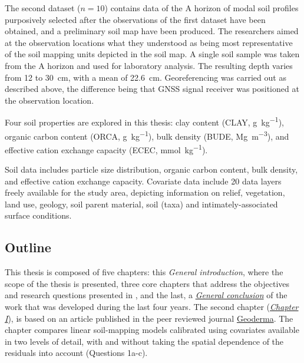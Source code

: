 The second dataset ($n = 10$) contains data of the A horizon of modal soil profiles purposively 
selected after the observations of the first dataset have been obtained, and a preliminary soil map 
have been produced. The researchers aimed at the observation locations what they understood as
being most representative of the soil mapping units depicted in the soil map. A single soil sample
was taken from the A horizon and used for laboratory analysis. The resulting depth varies from 
\num{12} to \SI{30}{\centi\metre}, with a mean of \SI{22.6}{\centi\metre}. Georeferencing was 
carried out as described above, the difference being that GNSS signal receiver was positioned at the
observation location.

Four soil properties are explored in this thesis: clay content (CLAY, \si{\gram\per\kilo\gram}), 
organic carbon content (ORCA, \si{\gram\per\kilo\gram}), bulk density (BUDE, 
\si{\mega\gram\per\cubic\metre}), and effective cation exchange capacity (ECEC, 
\si{\milli\mole\per\kilo\gram}).

Soil data includes particle size distribution, organic carbon content, bulk density, and effective 
cation exchange capacity. Covariate data include 20 data layers freely available for the study area, 
depicting information on relief, vegetation, land use, geology, soil parent material, soil (taxa) 
and intimately-associated surface conditions.




\subsection{Outline}

This thesis is composed of five chapters: this \textit{General introduction}, where the scope of the
thesis is presented, three core chapters that address the objectives and research questions presented
in , and the last, a \hyperref[chap:conclusion]{\textit{General conclusion}}
of the work that was developed during the last four years. The second chapter (\hyperref[chap:chapter01]{\textit{Chapter
I}}), is based on an article published in the peer reviewed journal 
\href{http://www.journals.elsevier.com/geoderma/}{Geoderma}. The chapter compares linear soil-mapping
 models calibrated using covariates available in two levels of detail, with and without taking the 
spatial dependence of the residuals into account (Questions 1a-c).

